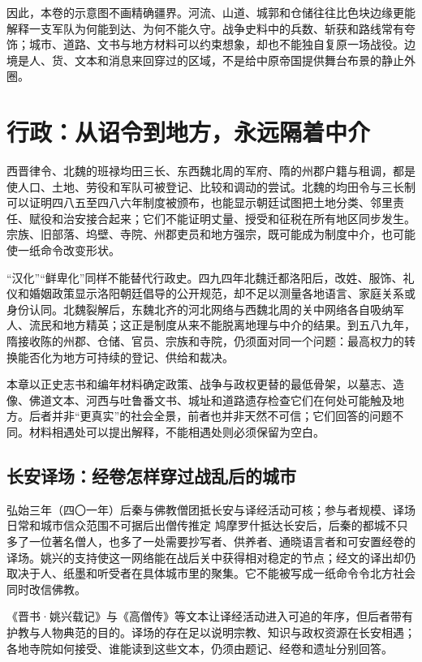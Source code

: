 因此，本卷的示意图不画精确疆界。河流、山道、城郭和仓储往往比色块边缘更能解释一支军队为何能到达、为何不能久守。战争史料中的兵数、斩获和路线常有夸饰；城市、道路、文书与地方材料可以约束想象，却也不能独自复原一场战役。边境是人、货、文本和消息来回穿过的区域，不是给中原帝国提供舞台布景的静止外圈。

\section{行政：从诏令到地方，永远隔着中介}
\label{sec:synthesis-administration}

西晋律令、北魏的班禄均田三长、东西魏北周的军府、隋的州郡户籍与租调，都是使人口、土地、劳役和军队可被登记、比较和调动的尝试。北魏的均田令与三长制可以证明四八五至四八六年制度被颁布，也能显示朝廷试图把土地分类、邻里责任、赋役和治安接合起来；它们不能证明丈量、授受和征税在所有地区同步发生。宗族、旧部落、坞壁、寺院、州郡吏员和地方强宗，既可能成为制度中介，也可能使一纸命令改变形状。

“汉化”“鲜卑化”同样不能替代行政史。四九四年北魏迁都洛阳后，改姓、服饰、礼仪和婚姻政策显示洛阳朝廷倡导的公开规范，却不足以测量各地语言、家庭关系或身份认同。北魏裂解后，东魏北齐的河北网络与西魏北周的关中网络各自吸纳军人、流民和地方精英；这正是制度从来不能脱离地理与中介的结果。到五八九年，隋接收陈的州郡、仓储、官员、宗族和寺院，仍须面对同一个问题：最高权力的转换能否化为地方可持续的登记、供给和裁决。

\begin{sourcenote}[综合章的材料责任]
本章以正史志书和编年材料确定政策、战争与政权更替的最低骨架，以墓志、造像、佛道文本、河西与吐鲁番文书、城址和道路遗存检查它们在何处可能触及地方。后者并非“更真实”的社会全景，前者也并非天然不可信；它们回答的问题不同。材料相遇处可以提出解释，不能相遇处则必须保留为空白。
\end{sourcenote}

\subsection{长安译场：经卷怎样穿过战乱后的城市}
\begin{event}{}{弘始三年（四〇一年）}{后秦与佛教僧团}{抵长安与译经活动可核；参与者规模、译场日常和城市信众范围不可据后出僧传推定}
鸠摩罗什抵达长安后，后秦的都城不只多了一位著名僧人，也多了一处需要抄写者、供养者、通晓语言者和可安置经卷的译场。姚兴的支持使这一网络能在战后关中获得相对稳定的节点；经文的译出却仍取决于人、纸墨和听受者在具体城市里的聚集。它不能被写成一纸命令令北方社会同时改信佛教。

《晋书·姚兴载记》与《高僧传》等文本让译经活动进入可追的年序，但后者带有护教与人物典范的目的。译场的存在足以说明宗教、知识与政权资源在长安相遇；各地寺院如何接受、谁能读到这些文本，仍须由题记、经卷和遗址分别回答。
\end{event}